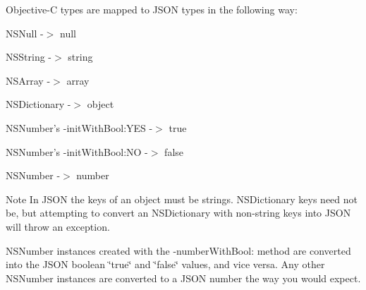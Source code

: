 Objective-\/\-C types are mapped to J\-S\-O\-N types in the following way\-:

\begin{DoxyItemize}
\item N\-S\-Null -\/$>$ null \item N\-S\-String -\/$>$ string \item N\-S\-Array -\/$>$ array \item N\-S\-Dictionary -\/$>$ object \item N\-S\-Number's -\/init\-With\-Bool\-:Y\-E\-S -\/$>$ true \item N\-S\-Number's -\/init\-With\-Bool\-:N\-O -\/$>$ false \item N\-S\-Number -\/$>$ number\end{DoxyItemize}
\begin{DoxyNote}{Note}
In J\-S\-O\-N the keys of an object must be strings. N\-S\-Dictionary keys need not be, but attempting to convert an N\-S\-Dictionary with non-\/string keys into J\-S\-O\-N will throw an exception.
\end{DoxyNote}
N\-S\-Number instances created with the -\/number\-With\-Bool\-: method are converted into the J\-S\-O\-N boolean \char`\"{}true\char`\"{} and \char`\"{}false\char`\"{} values, and vice versa. Any other N\-S\-Number instances are converted to a J\-S\-O\-N number the way you would expect. 